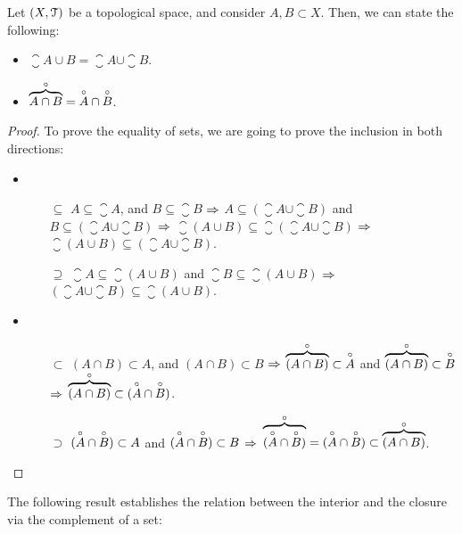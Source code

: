 \begin{lemma}
	\label{lem:interior-closure-union-intersection}
	Let $(X, \EuScript{T})$ be a topological space, and consider $A,B\subset X$. Then, we can state the following:
	\begin{itemize}
		\item $\closure{A\cup B}=\closure{A}\cup\closure{B}$.
		\item $\overbrace{A\cap B}^{\circ}=\overset{\circ}{A}\cap\overset{\circ}{B}$.
	\end{itemize}
\end{lemma}
\begin{proof} To prove the equality of sets, we are going to prove the inclusion in both directions:
	\begin{itemize}
		\item \begin{itemize}
				\item[$\boxed{\subseteq}$] $A\subseteq \closure{A}$, and $B\subseteq\closure{B}$ $\Rightarrow$ $A\subseteq (\closure{A}\cup\closure{B})$ and $B\subseteq (\closure{A}\cup\closure{B})$ $\Rightarrow$ $\closure{(A\cup B)}\subseteq \closure{(\closure{A}\cup\closure{B})}$ $\Rightarrow$ $\closure{(A\cup B)}\subseteq (\closure{A}\cup\closure{B})$.
				\item[$\boxed{\supseteq}$] $\closure{A}\subseteq \closure{(A\cup B)}$ and $\closure{B}\subseteq\closure{(A\cup B)}$ $\Rightarrow$ $(\closure{A}\cup\closure{B})\subseteq \closure{(A\cup B)}$.
			\end{itemize}
		\item \begin{itemize}
				\item[$\boxed{\subset}$] $(A\cap B)\subset A$, and $(A\cap B)\subset B$ $\Rightarrow$ $\overbrace{(A\cap B)}^{\circ}\subset \overset{\circ}{A}$ and $\overbrace{(A\cap B)}^{\circ} \subset \overset{\circ}{B}$ $\Rightarrow$ $\overbrace{(A\cap B)}^{\circ}\subset (\overset{\circ}{A}\cap\overset{\circ}{B})$.
				\item[$\boxed{\supset}$] $(\overset{\circ}{A}\cap\overset{\circ}{B})\subset A$ and $(\overset{\circ}{A}\cap\overset{\circ}{B})\subset B$ $\Rightarrow$ $\overbrace{(\overset{\circ}{A}\cap\overset{\circ}{B})}^{\circ}=(\overset{\circ}{A}\cap\overset{\circ}{B})\subset\overbrace{(A\cap B)}^{\circ}$.
			\end{itemize}
	\end{itemize}
\end{proof}

The following result establishes the relation between the interior and the closure via the complement of a set:

